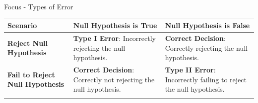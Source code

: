 \documentclass[
  ignorenonframetext,
]{beamer}
\begin{document}
\begin{frame}{Focus - Types of Error}
\label{focus---types-of-error-1}
\begin{longtable}[]{@{}
  >{\raggedright\arraybackslash}p{}
  >{\raggedright\arraybackslash}p{}
  >{\raggedright\arraybackslash}p{}@{}}
\toprule\noalign{}
\begin{minipage}[b]{\linewidth}\raggedright
Scenario
\end{minipage} & \begin{minipage}[b]{\linewidth}\raggedright
Null Hypothesis is True
\end{minipage} & \begin{minipage}[b]{\linewidth}\raggedright
Null Hypothesis is False
\end{minipage} \\
\midrule\noalign{}
\endhead
\textbf{Reject Null Hypothesis} & \textbf{Type I Error}: Incorrectly
rejecting the null hypothesis. & \textbf{Correct Decision}: Correctly
rejecting the null hypothesis. \\
\textbf{Fail to Reject Null Hypothesis} & \textbf{Correct Decision}:
Correctly not rejecting the null hypothesis. & \textbf{Type II Error}:
Incorrectly failing to reject the null hypothesis. \\
\bottomrule\noalign{}
\end{longtable}
\end{frame}
\end{document}
